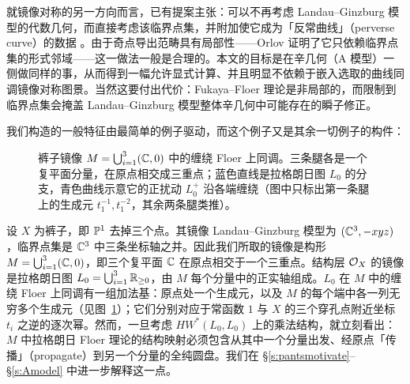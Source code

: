 就镜像对称的另一方向而言，已有提案主张：可以不再考虑 Landau--Ginzburg 模型的代数几何，而直接考虑该临界点集，并附加使它成为「反常曲线」（perverse curve）的数据 \cite{GKR,Ruddat}。由于奇点导出范畴具有局部性——Orlov 证明了它只依赖临界点集的形式邻域——这一做法一般是合理的。本文的目标是在辛几何（A 模型）一侧做同样的事，从而得到一幅允许显式计算、并且明显不依赖于嵌入选取的曲线同调镜像对称图景。当然这要付出代价：Fukaya--Floer 理论是非局部的，而限制到临界点集会掩盖 Landau--Ginzburg 模型整体辛几何中可能存在的瞬子修正。

我们构造的一般特征由最简单的例子驱动，而这个例子又是其余一切例子的构件：

\begin{figure}[t]
\centering
{}
\caption{裤子镜像 $M=\bigcup_{i=1}^3(\mathbb{C},0)$ 中的缠绕 Floer 上同调。三条腿各是一个复平面分量，在原点相交成三重点；蓝色直线是拉格朗日图 $L_0$ 的分支，青色曲线示意它的正扰动 $L_0^+$ 沿各端缠绕（图中只标出第一条腿上的生成元 $t_1^{-1},t_1^{-2}$，其余两条腿类推）。}\label{fig:pantsmirror}
\end{figure}

\begin{example}\label{ex:pants}
设 $X$ 为裤子，即 $\mathbb{P}^1$ 去掉三个点。其镜像 Landau--Ginzburg 模型为 $(\mathbb{C}^3,-xyz)$，临界点集是 $\mathbb{C}^3$ 中三条坐标轴之并。因此我们所取的镜像是构形 $M=\bigcup_{i=1}^3(\mathbb{C},0)$，即三个复平面 $\mathbb{C}$ 在原点相交于一个三重点。结构层 $\mathcal{O}_X$ 的镜像是拉格朗日图 $L_0=\bigcup_{i=1}^3\mathbb{R}_{\ge 0}$，由 $M$ 每个分量中的正实轴组成。$L_0$ 在 $M$ 中的缠绕 Floer 上同调有一组加法基：原点处一个生成元，以及 $M$ 的每个端中各一列无穷多个生成元（见图~\ref{fig:pantsmirror}）；它们分别对应于常函数 $1$ 与 $X$ 的三个穿孔点附近坐标 $t_i$ 之逆的逐次幂。然而，一旦考虑 $HW^*(L_0,L_0)$ 上的乘法结构，就立刻看出：$M$ 中拉格朗日 Floer 理论的结构映射必须包含从其中一个分量出发、经原点「传播」（propagate）到另一个分量的全纯圆盘。我们在 §\ref{s:pantsmotivate}--§\ref{s:Amodel} 中进一步解释这一点。
\end{example}

